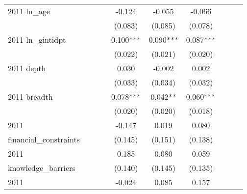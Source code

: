 \begin{table}[htbp]
\begin{tabular}{l*{9}{c}}
2011 ln\_age         &               &               &               &      -0.124   &      -0.055   &      -0.066   &               &               &               \\
                    &               &               &               &     (0.083)   &     (0.085)   &     (0.078)   &               &               &               \\
2011 ln\_gintidpt    &               &               &               &       0.100***&       0.090***&       0.087***&               &               &               \\
                    &               &               &               &     (0.022)   &     (0.021)   &     (0.020)   &               &               &               \\
2011 depth          &               &               &               &       0.030   &      -0.002   &       0.002   &               &               &               \\
                    &               &               &               &     (0.033)   &     (0.034)   &     (0.032)   &               &               &               \\
2011 breadth        &               &               &               &       0.078***&       0.042** &       0.060***&               &               &               \\
                    &               &               &               &     (0.020)   &     (0.020)   &     (0.018)   &               &               &               \\
2011                &               &               &               &      -0.147   &       0.019   &       0.080   &               &               &               \\
financial\_constraints&               &               &               &     (0.145)   &     (0.151)   &     (0.138)   &               &               &               \\
2011                &               &               &               &       0.185   &       0.080   &       0.059   &               &               &               \\
knowledge\_barriers  &               &               &               &     (0.140)   &     (0.145)   &     (0.135)   &               &               &               \\
2011                &               &               &               &      -0.024   &       0.085   &       0.157   &               &               &               \\

\end{tabular}
\end{table}
